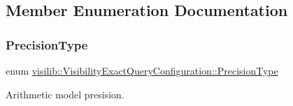 \subsection{Member Enumeration Documentation}
\mbox{\label{structvisilib_1_1_visibility_exact_query_configuration_a1cd44b0dffc3d51eb0bd5af35eeb9a8b}} 
\subsubsection{\texorpdfstring{PrecisionType}{PrecisionType}}
{\footnotesize\ttfamily enum \mbox{\hyperlink{structvisilib_1_1_visibility_exact_query_configuration_a1cd44b0dffc3d51eb0bd5af35eeb9a8b}{visilib\+::\+Visibility\+Exact\+Query\+Configuration\+::\+Precision\+Type}}}



Arithmetic model presision. 

